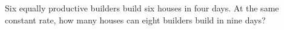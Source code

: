 Six equally productive builders build six houses in four days. At the same constant rate, how many houses can eight builders build in nine days?
